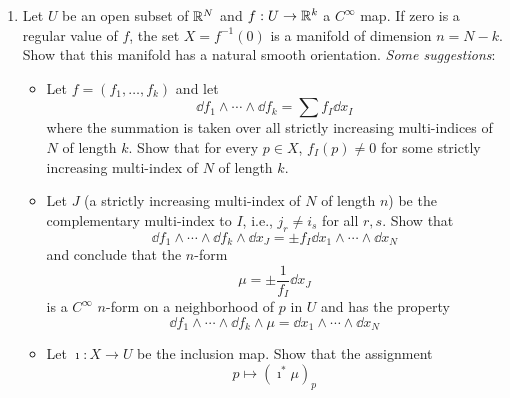 \documentclass[../psets.tex]{subfiles}
\begin{document}
\begin{enumerate}[label={\textbf{4.4.\roman*.}}]
\begin{proof}
        Therefore, tying everything together, we have that
        \begin{align*}
            \phi^*\sigma &= (\det(\phi_{i,j}))^{1/2}\dd{x_1}\wedge\cdots\wedge\dd{x_n}\\
            &= \left( 1+\sum_{i=1}^n\left( \pdv{f}{x_i} \right)^2 \right)^{1/2}\dd{x_1}\wedge\cdots\wedge\dd{x_n}
        \end{align*}
        as desired.
    \end{proof}
    \item Let $U$ be an open subset of $\mathbb{R}^N$ and $f:U\to\mathbb{R}^k$ a $C^\infty$ map. If zero is a regular value of $f$, the set $X=f^{-1}(0)$ is a manifold of dimension $n=N-k$. Show that this manifold has a natural smooth orientation. \emph{Some suggestions}:
    \begin{itemize}[label={\scriptsize$\blacktriangleright$}]
        \item Let $f=(f_1,\dots,f_k)$ and let
        \begin{equation*}
            \dd{f_1}\wedge\cdots\wedge\dd{f_k} = \sum f_I\dd{x_I}
        \end{equation*}
        where the summation is taken over all strictly increasing multi-indices of $N$ of length $k$. Show that for every $p\in X$, $f_I(p)\neq 0$ for some strictly increasing multi-index of $N$ of length $k$.
        \item Let $J$ (a strictly increasing multi-index of $N$ of length $n$) be the complementary multi-index to $I$, i.e., $j_r\neq i_s$ for all $r,s$. Show that
        \begin{equation*}
            \dd{f_1}\wedge\cdots\wedge\dd{f_k}\wedge\dd{x_J} = \pm f_I\dd{x_1}\wedge\cdots\wedge\dd{x_N}
        \end{equation*}
        and conclude that the $n$-form
        \begin{equation*}
            \mu = \pm\frac{1}{f_I}\dd{x_J}
        \end{equation*}
        is a $C^\infty$ $n$-form on a neighborhood of $p$ in $U$ and has the property
        \begin{equation*}
            \dd{f_1}\wedge\cdots\wedge\dd{f_k}\wedge\mu = \dd{x_1}\wedge\cdots\wedge\dd{x_N}
        \end{equation*}
        \item Let $\imath:X\to U$ be the inclusion map. Show that the assignment
        \begin{equation*}
            p \mapsto (\imath^*\mu)_p

\end{equation*}
\end{itemize}
\end{enumerate}
\end{document}
